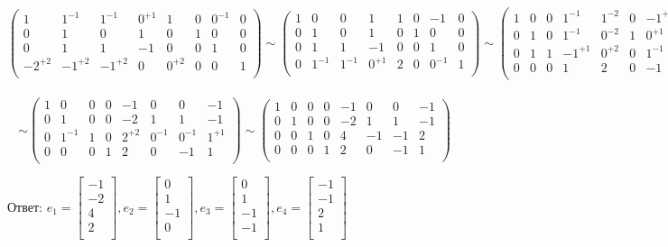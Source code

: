\documentclass{article}
\begin{document}
\noindent$$\left(\begin{array}{llll|llll}
1 & 1^{-1} & 1^{-1} & 0^{+1} & 1 & 0 & 0^{-1} & 0 \\
0 & 1 & 0 & 1 & 0 & 1 & 0 & 0 \\
0 & 1 & 1 & -1 & 0 & 0 & 1 & 0 \\
-2^{+2} & -1^{+2} & -1^{+2} & 0 & 0^{+2} & 0 & 0 & 1 \\
\end{array}\right) \sim
\left(\begin{array}{llll|llll}
1 & 0 & 0 & 1 & 1 & 0 & -1 & 0 \\
0 & 1 & 0 & 1 & 0 & 1 & 0 & 0 \\
0 & 1 & 1 & -1 & 0 & 0 & 1 & 0 \\
0 & 1^{-1} & 1^{-1} & 0^{+1} & 2 & 0 & 0^{-1} & 1 \\
\end{array}\right) \sim
\left(\begin{array}{llll|llll}
1 & 0 & 0 & 1^{-1} & 1^{-2} & 0 & -1^{+1} & 0^{-1} \\
0 & 1 & 0 & 1^{-1} & 0^{-2} & 1 & 0^{+1} & 0^{-1} \\
0 & 1 & 1 & -1^{+1} & 0^{+2} & 0 & 1^{-1} & 0^{+1} \\
0 & 0 & 0 & 1 & 2 & 0 & -1 & 1 \\
\end{array}\right) \sim$$ \\
$$\sim \left(\begin{array}{llll|llll}
1 & 0 & 0 & 0 & -1 & 0 & 0 & -1 \\
0 & 1 & 0 & 0 & -2 & 1 & 1 & -1 \\
0 & 1^{-1} & 1 & 0 & 2^{+2} & 0^{-1} & 0^{-1} & 1^{+1} \\
0 & 0 & 0 & 1 & 2 & 0 & -1 & 1 \\
\end{array}\right) \sim
\left(\begin{array}{rrrr|rrrr}
1 & 0 & 0 & 0 & -1 & 0 & 0 & -1 \\
0 & 1 & 0 & 0 & -2 & 1 & 1 & -1 \\
0 & 0 & 1 & 0 & 4 & -1 & -1 & 2 \\
0 & 0 & 0 & 1 & 2 & 0 & -1 & 1 \\
\end{array}\right)$$
\begin{flushright}
Ответ: $e_1 = \left[\begin{array}{r}-1\\-2\\4\\2\\\end{array}\right],
e_2 = \left[\begin{array}{r}0\\1\\-1\\0\\\end{array}\right],
e_3 = \left[\begin{array}{r}0\\1\\-1\\-1\\\end{array}\right],
e_4 = \left[\begin{array}{r}-1\\-1\\2\\1\\\end{array}\right]$
\end{flushright}
\end{document}
